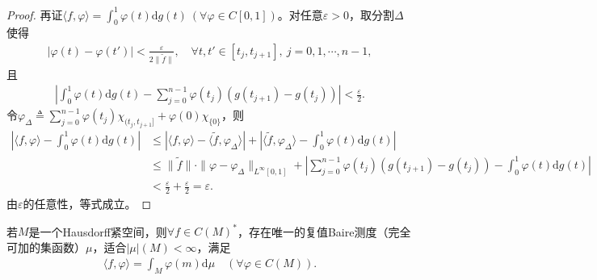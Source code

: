 \documentclass[../../main.tex]{subfiles}%
\begin{document}
\begin{proof}
再证$\langle f,\varphi\rangle=\int_{0}^{1}\varphi(t)\mathrm{d}g(t)\ (\forall\varphi\in C[0,1])$。对任意$\varepsilon>0$，取分割$\Delta$使得
\begin{align*}
|\varphi(t)-\varphi(t')|<\frac{\varepsilon}{2\|\widetilde{f}\|},\quad\forall t,t'\in[t_j,t_{j+1}],\ j=0,1,\cdots,n-1,
\end{align*}
且
\begin{align*}
\left|\int_{0}^{1}\varphi(t)\mathrm{d}g(t)-\sum\limits_{j=0}^{n-1}\varphi(t_j)(g(t_{j+1})-g(t_j))\right|<\frac{\varepsilon}{2}.
\end{align*}
令$\varphi_\Delta\triangleq\sum\limits_{j=0}^{n-1}\varphi(t_j)\chi_{(t_j,t_{j+1}]}+\varphi(0)\chi_{\{0\}}$，则
\begin{align*}
\left|\langle f,\varphi\rangle-\int_{0}^{1}\varphi(t)\mathrm{d}g(t)\right|
&\leqslant\left|\langle f,\varphi\rangle-\langle\widetilde{f},\varphi_\Delta\rangle\right|+\left|\langle\widetilde{f},\varphi_\Delta\rangle-\int_{0}^{1}\varphi(t)\mathrm{d}g(t)\right|\\
&\leqslant\|\widetilde{f}\|\cdot\|\varphi-\varphi_\Delta\|_{L^\infty[0,1]}+\left|\sum\limits_{j=0}^{n-1}\varphi(t_j)(g(t_{j+1})-g(t_j))-\int_{0}^{1}\varphi(t)\mathrm{d}g(t)\right|\\
&<\frac{\varepsilon}{2}+\frac{\varepsilon}{2}=\varepsilon.
\end{align*}
由$\varepsilon$的任意性，等式成立。

\end{proof}

\begin{theorem}\label{theorem:泛函分析--Riesz表示定理连续函数空间}
若$M$是一个Hausdorff紧空间，则$\forall f\in C(M)^*$，存在唯一的复值Baire测度（完全可加的集函数）$\mu$，适合$|\mu|(M)<\infty$，满足
\begin{align}
\langle f,\varphi\rangle = \int_{M}\varphi(m)\mathrm{d}\mu \quad (\forall \varphi\in C(M)).
\end{align}
\end{theorem}
\end{document}
